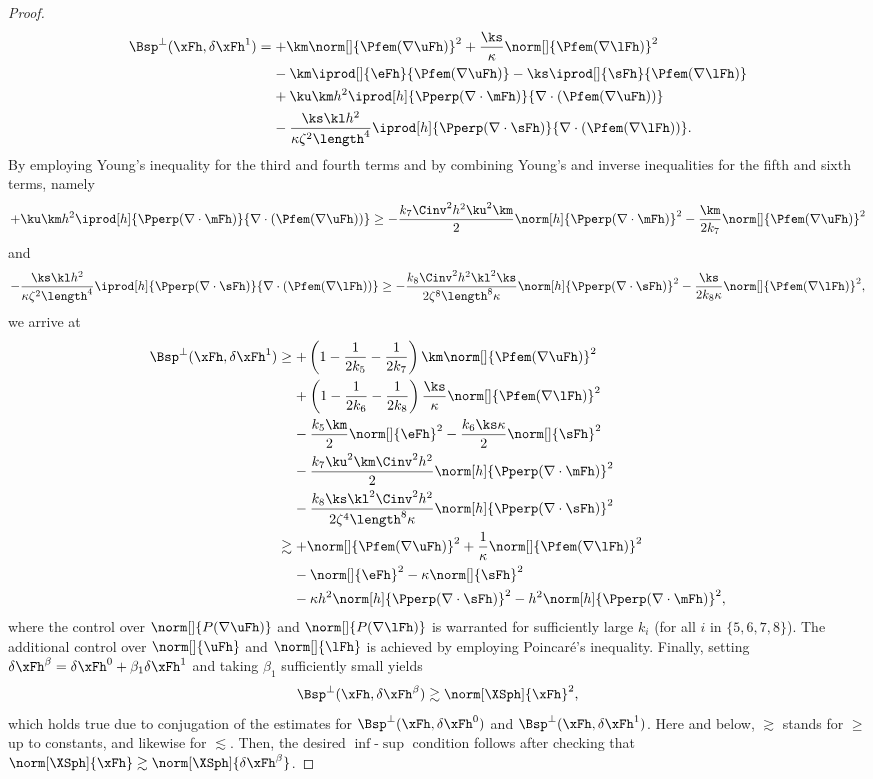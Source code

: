 \begin{proof}
\begin{align*}
\Bsp^\perp(\xFh,\delta\xFh^1)
&=
+\km\norm[]{\Pfem(\nabla\uFh)}^2 
+\frac{\ks}{\kappa}\norm[]{\Pfem(\nabla\lFh)}^2\\
&\:\:\:\:\:
-\km\iprod[]{\eFh}{\Pfem(\nabla\uFh)}
-\ks\iprod[]{\sFh}{\Pfem(\nabla\lFh)}\\
&\:\:\:\:\:
+\ku\km h^2\iprod[h]{\Pperp(\nabla\cdot\mFh)}{\nabla\cdot(\Pfem(\nabla\uFh))}\\
&\:\:\:\:\:
-\frac{\ks\kl h^2}{\kappa\zeta^2\length^4}\iprod[h]{\Pperp(\nabla\cdot\sFh)}{\nabla\cdot(\Pfem(\nabla\lFh))}.
\end{align*}
By employing Young's inequality for the third and fourth terms and by combining Young's and inverse inequalities for the fifth and sixth terms, namely
$$+\ku\km h^2\iprod[h]{\Pperp(\nabla\cdot\mFh)}{\nabla\cdot(\Pfem(\nabla\uFh))}
\geq
-\frac{k_7\Cinv^2 h^2\ku^2\km}{2}\norm[h]{\Pperp(\nabla\cdot\mFh)}^2
- \frac{\km}{2 k_7}\norm[]{\Pfem(\nabla\uFh)}^2$$
and
$$-\frac{\ks\kl h^2}{\kappa\zeta^2\length^4}\iprod[h]{\Pperp(\nabla\cdot\sFh)}{\nabla\cdot(\Pfem(\nabla\lFh))}
\geq
-\frac{k_8\Cinv^2 h^2\kl^2\ks}{2\zeta^8\length^8\kappa}\norm[h]{\Pperp(\nabla\cdot\sFh)}^2
-\frac{\ks}{2 k_8\kappa}\norm[]{\Pfem(\nabla\lFh)}^2,$$
we arrive at
\begin{align*}
\Bsp^\perp(\xFh,\delta\xFh^1)
&\geq
+\left(1-\frac{1}{2 k_5}-\frac{1}{2 k_7}\right)\km\norm[]{\Pfem(\nabla\uFh)}^2
\\
&\:\:\:\:\:
+\left(1-\frac{1}{2 k_6}-\frac{1}{2 k_8}\right)\frac{\ks}{\kappa}\norm[]{\Pfem(\nabla\lFh)}^2\\
&\:\:\:\:\:
-\frac{k_5\km}{2}\norm[]{\eFh}^2
-\frac{k_6\ks\kappa}{2}\norm[]{\sFh}^2\\
&\:\:\:\:\:
-\frac{k_7\ku^2\km\Cinv^2 h^2}{2}\norm[h]{\Pperp(\nabla\cdot\mFh)}^2\\
&\:\:\:\:\:
-\frac{k_8\ks\kl^2\Cinv^2 h^2}{2 \zeta^4\length^8\kappa}\norm[h]{\Pperp(\nabla\cdot\sFh)}^2\\
&\gtrsim
+\norm[]{\Pfem(\nabla\uFh)}^2
+\frac{1}{\kappa}\norm[]{\Pfem(\nabla\lFh)}^2\\
&\:\:\:\:\:
-\norm[]{\eFh}^2
-\kappa\norm[]{\sFh}^2\\
&\:\:\:\:\:
-\kappa h^2\norm[h]{\Pperp(\nabla\cdot\sFh)}^2
-h^2\norm[h]{\Pperp(\nabla\cdot\mFh)}^2,
\end{align*}
where the control over $\norm[]{P(\nabla\uFh)}$ and $\norm[]{P(\nabla\lFh)}$ is warranted for sufficiently large $k_i$ (for all $i$ in $\{5,6,7,8\}$).
The additional control over $\norm[]{\uFh}$ and $\norm[]{\lFh}$ is achieved by employing Poincaré's inequality.
Finally, setting
$\delta\xFh^\beta = \delta\xFh^0+\beta_1\delta\xFh^1$
and taking $\beta_1$ sufficiently small yields
$$
\Bsp^\perp(\xFh,\delta\xFh^\beta) \gtrsim \norm[\XSph]{\xFh}^2,
$$
which holds true due to conjugation of the estimates for $\Bsp^\perp(\xFh,\delta\xFh^0)$ and $\Bsp^\perp(\xFh,\delta\xFh^1)$. Here and below, $\gtrsim$ stands for $\geq$ up to constants, and likewise for $\lesssim$. Then, the desired $\inf$-$\sup$ condition follows after checking that $\norm[\XSph]{\xFh}\gtrsim\norm[\XSph]{\delta\xFh^\beta}$.
\end{proof}

